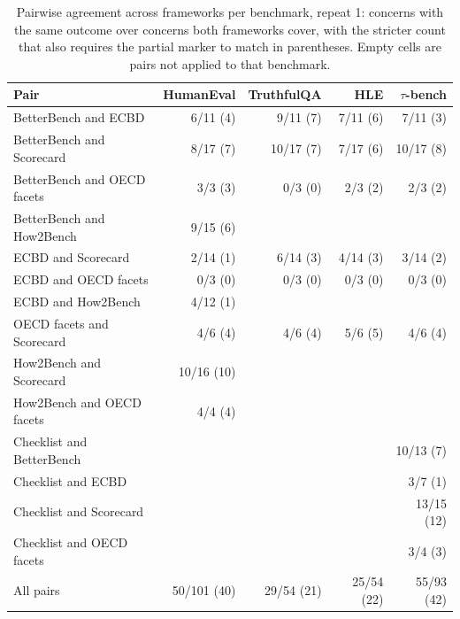 \begin{table}[t]
\caption{Pairwise agreement across frameworks per benchmark, repeat 1: concerns with the same outcome over concerns both frameworks cover, with the stricter count that also requires the partial marker to match in parentheses. Empty cells are pairs not applied to that benchmark.}
\label{tab:pairwise}
\small\centering\begin{tabular}{lrrrr}\toprule
Pair & HumanEval & TruthfulQA & HLE & $\tau$-bench \\
\midrule
BetterBench and ECBD & 6/11 (4) & 9/11 (7) & 7/11 (6) & 7/11 (3) \\
BetterBench and Scorecard & 8/17 (7) & 10/17 (7) & 7/17 (6) & 10/17 (8) \\
BetterBench and OECD facets & 3/3 (3) & 0/3 (0) & 2/3 (2) & 2/3 (2) \\
BetterBench and How2Bench & 9/15 (6) &  &  &  \\
ECBD and Scorecard & 2/14 (1) & 6/14 (3) & 4/14 (3) & 3/14 (2) \\
ECBD and OECD facets & 0/3 (0) & 0/3 (0) & 0/3 (0) & 0/3 (0) \\
ECBD and How2Bench & 4/12 (1) &  &  &  \\
OECD facets and Scorecard & 4/6 (4) & 4/6 (4) & 5/6 (5) & 4/6 (4) \\
How2Bench and Scorecard & 10/16 (10) &  &  &  \\
How2Bench and OECD facets & 4/4 (4) &  &  &  \\
Checklist and BetterBench &  &  &  & 10/13 (7) \\
Checklist and ECBD &  &  &  & 3/7 (1) \\
Checklist and Scorecard &  &  &  & 13/15 (12) \\
Checklist and OECD facets &  &  &  & 3/4 (3) \\
\midrule
All pairs & 50/101 (40) & 29/54 (21) & 25/54 (22) & 55/93 (42) \\
\bottomrule\end{tabular}
\end{table}
